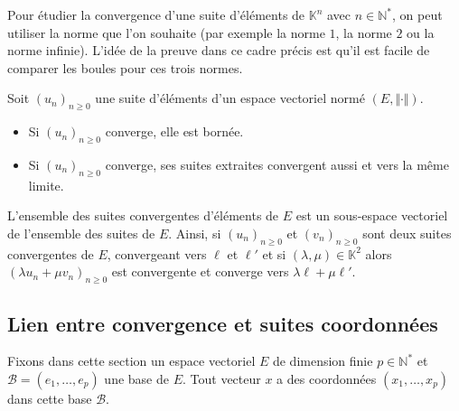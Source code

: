 \documentclass[french,11pt,twoside]{VcCours}
\begin{document}
%

\begin{Exemple} Pour étudier la convergence d'une suite d'éléments de $\mathbb{K}^n$ avec $n \in \mathbb{N}^*$, on peut utiliser la norme que l'on souhaite (par exemple la norme $1$, la norme $2$ ou la norme infinie). L'idée de la preuve dans ce cadre précis est qu'il est facile de comparer les boules pour ces trois normes.
\end{Exemple}

\begin{Proposition}{} Soit $(u_n)_{n \geq 0}$ une suite d'éléments d'un espace vectoriel normé $(E, \Vert \cdot \Vert)$.

\begin{itemize}
\item Si $(u_n)_{n \geq 0}$ converge, elle est bornée.
\item Si $(u_n)_{n \geq 0}$ converge, ses suites extraites convergent aussi et vers la même limite.
\end{itemize}
\end{Proposition}

\begin{Proposition}{} L'ensemble des suites convergentes d'éléments de $E$ est un sous-espace vectoriel de l'ensemble des suites de $E$. Ainsi, si $(u_n)_{n \geq 0}$ et $(v_n)_{n \geq 0}$ sont deux suites convergentes de $E$, convergeant vers $\ell$ et $\ell'$ et si $(\lambda, \mu) \in \mathbb{K}^2$ alors $(\lambda u_n + \mu v_n)_{n \geq 0}$ est convergente et converge vers $\lambda \ell + \mu \ell'$.
\end{Proposition}


\subsection{Lien entre convergence et suites coordonnées}

Fixons dans cette section un espace vectoriel $E$ de dimension finie $p \in \mathbb{N}^*$ et $\mathcal{B} = (e_1, \ldots, e_p)$ une base de $E$. Tout vecteur $x$ a des coordonnées $(x_1, \ldots, x_p)$ dans cette base $\mathcal{B}$. 
\end{document}
